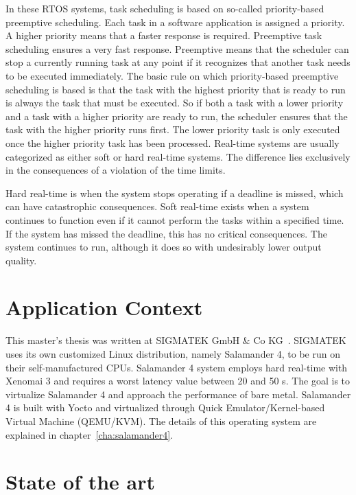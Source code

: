 \documentclass[MMR,Master,english]{twbook}
\begin{document}
\bigskip \noindent In these RTOS systems, task scheduling is based on so-called priority-based preemptive scheduling. Each task in a software application is assigned a priority. A higher priority means that a faster response is required. Preemptive task scheduling ensures a very fast response. Preemptive means that the scheduler can stop a currently running task at any point if it recognizes that another task needs to be executed immediately. The basic rule on which priority-based preemptive scheduling is based is that the task with the highest priority that is ready to run is always the task that must be executed. So if both a task with a lower priority and a task with a higher priority are ready to run, the scheduler ensures that the task with the higher priority runs first. The lower priority task is only executed once the higher priority task has been processed. Real-time systems are usually categorized as either soft or hard real-time systems. The difference lies exclusively in the consequences of a violation of the time limits.

\bigskip \noindent Hard real-time is when the system stops operating if a deadline is missed, which can have catastrophic consequences. Soft real-time exists when a system continues to function even if it cannot perform the tasks within a specified time. If the system has missed the deadline, this has no critical consequences. The system continues to run, although it does so with undesirably lower output quality.

\clearpage
\section{Application Context}
This master's thesis was written at SIGMATEK GmbH \& Co KG~\cite{pixelartSIGMATEKKompletteAutomatisierungssysteme}.
SIGMATEK uses its own customized Linux distribution, namely Salamander 4, to be run on their self-manufactured CPUs. Salamander 4 system employs hard real-time with Xenomai 3 and requires a worst latency value between 20 and 50 \textmu s. The goal is to virtualize Salamander 4 and approach the performance of bare metal. Salamander 4 is built with Yocto and virtualized through Quick Emulator/Kernel-based Virtual Machine (QEMU/KVM). The details of this operating system are explained in chapter~\ref{cha:salamander4}. 

\section{State of the art}
\end{document}
